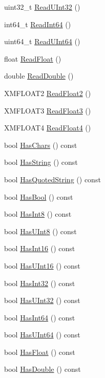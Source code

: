 \begin{DoxyCompactItemize}
uint32\+\_\+t \hyperlink{classmage_1_1_line_reader_a82d14aede3b4ebff8cc54345dfba2c4b}{Read\+U\+Int32} ()
\item 
int64\+\_\+t \hyperlink{classmage_1_1_line_reader_af78e657c17cfff3bfc5fed42fbc47085}{Read\+Int64} ()
\item 
uint64\+\_\+t \hyperlink{classmage_1_1_line_reader_ac05624eb7a786bfc1391b22095da1e71}{Read\+U\+Int64} ()
\item 
float \hyperlink{classmage_1_1_line_reader_ae691928873b110dd273e72a47f2008cb}{Read\+Float} ()
\item 
double \hyperlink{classmage_1_1_line_reader_a17f11afdea4692395115c6bdfde03660}{Read\+Double} ()
\item 
X\+M\+F\+L\+O\+A\+T2 \hyperlink{classmage_1_1_line_reader_a7a73a4e642db14da3f68ae65873ae333}{Read\+Float2} ()
\item 
X\+M\+F\+L\+O\+A\+T3 \hyperlink{classmage_1_1_line_reader_a44ca5af0189b181a0a361039015be2a3}{Read\+Float3} ()
\item 
X\+M\+F\+L\+O\+A\+T4 \hyperlink{classmage_1_1_line_reader_abf882fa99812f0b6f4d0d4af5b18b3f5}{Read\+Float4} ()
\item 
bool \hyperlink{classmage_1_1_line_reader_a7eb54d60902d1fb7846ea5c566312a0f}{Has\+Chars} () const
\item 
bool \hyperlink{classmage_1_1_line_reader_a011b5a0d1bd2d157033e3bf7d7323aed}{Has\+String} () const
\item 
bool \hyperlink{classmage_1_1_line_reader_ac92de9a3d986c7031c902c9489cfaa5a}{Has\+Quoted\+String} () const
\item 
bool \hyperlink{classmage_1_1_line_reader_ac18069cc6bc399ce6ad8ad069a073c6c}{Has\+Bool} () const
\item 
bool \hyperlink{classmage_1_1_line_reader_a1eecd5324b2e212826c49e600cc46e1f}{Has\+Int8} () const
\item 
bool \hyperlink{classmage_1_1_line_reader_a7d9359c8a65005358564728be9091fa8}{Has\+U\+Int8} () const
\item 
bool \hyperlink{classmage_1_1_line_reader_a36b83e0adfa48d9226ae59c23df8f44a}{Has\+Int16} () const
\item 
bool \hyperlink{classmage_1_1_line_reader_a15c7c3336330649062556e5b318af510}{Has\+U\+Int16} () const
\item 
bool \hyperlink{classmage_1_1_line_reader_af8402b39637e27877eac2909604bbf89}{Has\+Int32} () const
\item 
bool \hyperlink{classmage_1_1_line_reader_a56f82d5562d0254ec59871a3bb7ad837}{Has\+U\+Int32} () const
\item 
bool \hyperlink{classmage_1_1_line_reader_a3a7883e24fb3108a79ecda4eaac983f2}{Has\+Int64} () const
\item 
bool \hyperlink{classmage_1_1_line_reader_ad311b6edbfc68c01997f90cd1db5d95e}{Has\+U\+Int64} () const
\item 
bool \hyperlink{classmage_1_1_line_reader_ade0b6d83fc8cd6a4c64b2c97b9ff0bda}{Has\+Float} () const
\item 
bool \hyperlink{classmage_1_1_line_reader_ad6eb5eaf990bba426498d11c53bd31cd}{Has\+Double} () const
\end{DoxyCompactItemize}

